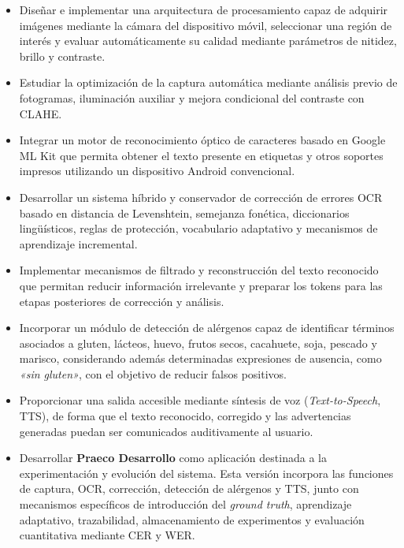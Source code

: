 \begin{itemize}
	
	\item Diseñar e implementar una arquitectura de procesamiento capaz de adquirir imágenes mediante la cámara del dispositivo móvil, seleccionar una región de interés y evaluar automáticamente su calidad mediante parámetros de nitidez, brillo y contraste.
	
	\item Estudiar la optimización de la captura automática mediante análisis previo de fotogramas, iluminación auxiliar y mejora condicional del contraste con CLAHE.

\item Integrar un motor de reconocimiento óptico de caracteres basado en Google ML Kit que permita obtener el texto presente en etiquetas y otros soportes impresos utilizando un dispositivo Android convencional.
	
	\item Desarrollar un sistema híbrido y conservador de corrección de errores OCR basado en distancia de Levenshtein, semejanza fonética, diccionarios lingüísticos, reglas de protección, vocabulario adaptativo y mecanismos de aprendizaje incremental.
	
	\item Implementar mecanismos de filtrado y reconstrucción del texto reconocido que permitan reducir información irrelevante y preparar los tokens para las etapas posteriores de corrección y análisis.
	
	\item Incorporar un módulo de detección de alérgenos capaz de identificar términos asociados a gluten, lácteos, huevo, frutos secos, cacahuete, soja, pescado y marisco, considerando además determinadas expresiones de ausencia, como \textit{«sin gluten»}, con el objetivo de reducir falsos positivos.
	
	\item Proporcionar una salida accesible mediante síntesis de voz (\textit{Text-to-Speech}, TTS), de forma que el texto reconocido, corregido y las advertencias generadas puedan ser comunicados auditivamente al usuario.
	
	\item Desarrollar \textbf{Praeco Desarrollo} como aplicación destinada a la experimentación y evolución del sistema. Esta versión incorpora las funciones de captura, OCR, corrección, detección de alérgenos y TTS, junto con mecanismos específicos de introducción del \textit{ground truth}, aprendizaje adaptativo, trazabilidad, almacenamiento de experimentos y evaluación cuantitativa mediante CER y WER.
	

\end{itemize}
